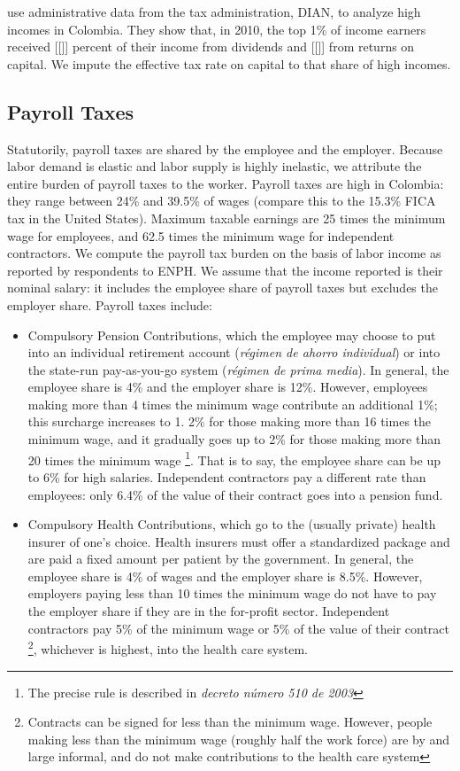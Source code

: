 \documentclass[12pt]{article}
\begin{document}
\begin{appendices}
\citet{juliana} use administrative data from the tax administration, DIAN, to analyze high incomes in Colombia.
They show that, in 2010, the top 1\% of income earners received [[]] percent of their income from dividends and [[]] from returns on capital.
We impute the effective tax rate on capital to that share of high incomes.

\subsection{Payroll Taxes}

Statutorily, payroll taxes are shared by the employee and the employer.
Because labor demand is elastic and labor supply is highly inelastic, we attribute the entire burden of payroll taxes to the worker.
Payroll taxes are high in Colombia: they range between 24\% and 39.5\% of wages (compare this to the 15.3\% FICA tax in the United States).
Maximum taxable earnings are 25 times the minimum wage for employees, and 62.5 times the minimum wage for independent contractors.
We compute the payroll tax burden on the basis of labor income as reported by respondents to ENPH.
We assume that the income reported is their nominal salary: it includes the employee share of payroll taxes but excludes the employer share.
Payroll taxes include:
\begin{itemize}

\item Compulsory Pension Contributions, which the employee may choose to put into an individual retirement account (\textit{r\'{e}gimen de ahorro individual}) or into the state-run pay-as-you-go system (\textit{r\'{e}gimen de prima media}).
  In general, the employee share is 4\% and the employer share is 12\%.
  However, employees making more than 4 times the minimum wage contribute an additional 1\%; this surcharge increases to 1.
  2\% for those making more than 16 times the minimum wage, and it gradually goes up to 2\% for those making more than 20 times the minimum wage \footnote{The precise rule is described in \textit{decreto n\'{u}mero 510 de 2003}}.
  That is to say, the employee share can be up to 6\% for high salaries.
  Independent contractors pay a different rate than employees: only 6.4\% of the value of their contract  goes into a pension fund.

\item Compulsory Health Contributions, which go to the (usually private) health insurer of one's choice.
  Health insurers must offer a standardized package and are paid a fixed amount per patient by the government.
  In general, the employee share is 4\% of wages and the employer share is 8.5\%.
  However, employers paying less than 10 times the minimum wage do not have to pay the employer share if they are in the for-profit sector.
  Independent contractors pay 5\% of the minimum wage or 5\% of the value of their contract \footnote{Contracts can be signed for less than the minimum wage.
    However, people making less than the minimum wage (roughly half the work force) are by and large informal, and do not make contributions to the health care system}, whichever is highest, into the health care system.


\end{itemize}
\end{appendices}
\end{document}
